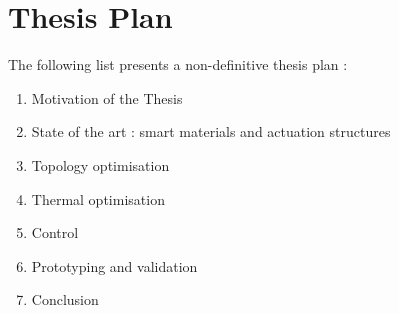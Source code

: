 \section{Thesis Plan}
The following list presents a non-definitive thesis plan :
\begin{enumerate}
  \item Motivation of the Thesis
  \item State of the art : smart materials and actuation structures
  \item Topology optimisation
  \item Thermal optimisation
  \item Control
  \item Prototyping and validation
  \item Conclusion
\end{enumerate}
